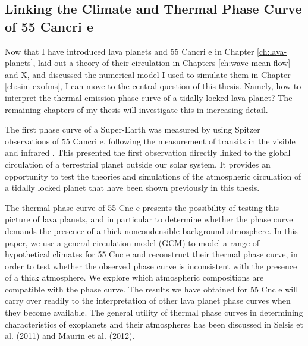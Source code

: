 \begin{SingleSpace}
\chapter{Linking the Climate and Thermal Phase Curve of 55 Cancri e}\label{ch:linking-climate-55cnce}
\vspace{0.5cm}
\end{SingleSpace}
\vspace{0.5cm}






Now that I have introduced lava planets and 55 Cancri e in Chapter \ref{ch:lava-planets}, laid out a theory of their circulation in Chapters \ref{ch:wave-mean-flow} and X, and discussed the numerical model I used to simulate them in Chapter \ref{ch:sim-exofms}, I can move to the central question of this thesis. Namely, how to interpret the thermal emission phase curve of a tidally locked lava planet? The remaining chapters of my thesis will investigate this in increasing detail.


The first phase curve of a Super-Earth was measured by \citet{demory201655cnce} using Spitzer observations of 55 Cancri e, following the measurement of transits in the visible \citep{winn201155cnce} and infrared
\citep{demory201155cnce}. This presented the first observation directly linked to the global circulation of a terrestrial planet outside our solar system. It provides an opportunity to test the theories and simulations of the atmospheric circulation of a tidally locked planet that have been shown previously in this thesis.

The thermal phase curve of 55 Cnc e presents the possibility of testing this picture of lava planets, and in particular to determine whether the phase curve demands
the presence of a thick noncondensible background atmosphere. In this paper, we use a general circulation
model (GCM) to model a range of hypothetical climates
for 55 Cnc e and reconstruct their thermal phase curve,
in order to test whether the observed phase curve is inconsistent with the presence of a thick atmosphere. We
explore which atmospheric compositions are compatible
with the phase curve. The results we have obtained
for 55 Cnc e will carry over readily to the interpretation of other lava planet phase curves when they become
available. The general utility of thermal phase curves in
determining characteristics of exoplanets and their atmospheres has been discussed in Selsis et al. (2011) and
Maurin et al. (2012).


